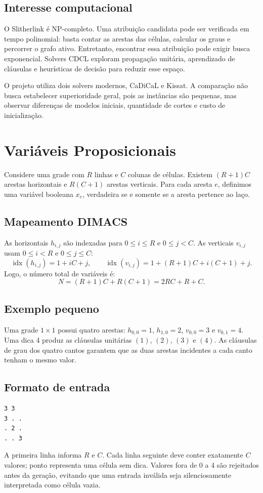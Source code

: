 \documentclass[11pt,a4paper]{article}
\begin{document}
\subsection{Interesse computacional}
O Slitherlink é NP-completo. Uma atribuição candidata pode ser verificada em tempo polinomial: basta contar as arestas das células, calcular os graus e percorrer o grafo ativo. Entretanto, encontrar essa atribuição pode exigir busca exponencial. Solvers CDCL exploram propagação unitária, aprendizado de cláusulas e heurísticas de decisão para reduzir esse espaço.

O projeto utiliza dois solvers modernos, CaDiCaL e Kissat. A comparação não busca estabelecer superioridade geral, pois as instâncias são pequenas, mas observar diferenças de modelos iniciais, quantidade de cortes e custo de inicialização.
\newpage

\section{Variáveis Proposicionais}
Considere uma grade com $R$ linhas e $C$ colunas de células. Existem $(R+1)C$ arestas horizontais e $R(C+1)$ arestas verticais. Para cada aresta $e$, definimos uma variável booleana $x_e$, verdadeira se e somente se a aresta pertence ao laço.

\subsection{Mapeamento DIMACS}
As horizontais $h_{i,j}$ são indexadas para $0\le i\le R$ e $0\le j<C$. As verticais $v_{i,j}$ usam $0\le i<R$ e $0\le j\le C$:
\[
\operatorname{idx}(h_{i,j})=1+iC+j,
\qquad
\operatorname{idx}(v_{i,j})=1+(R+1)C+i(C+1)+j.
\]
Logo, o número total de variáveis é:
\[
N=(R+1)C+R(C+1)=2RC+R+C.
\]

\subsection{Exemplo pequeno}
Uma grade $1\times1$ possui quatro arestas: $h_{0,0}=1$, $h_{1,0}=2$, $v_{0,0}=3$ e $v_{0,1}=4$. Uma dica 4 produz as cláusulas unitárias $(1)$, $(2)$, $(3)$ e $(4)$. As cláusulas de grau dos quatro cantos garantem que as duas arestas incidentes a cada canto tenham o mesmo valor.

\subsection{Formato de entrada}
\begin{lstlisting}
3 3
3 . .
. 2 .
. . 3
\end{lstlisting}
A primeira linha informa $R$ e $C$. Cada linha seguinte deve conter exatamente $C$ valores; ponto representa uma célula sem dica. Valores fora de 0 a 4 são rejeitados antes da geração, evitando que uma entrada inválida seja silenciosamente interpretada como célula vazia.
\newpage
\end{document}
